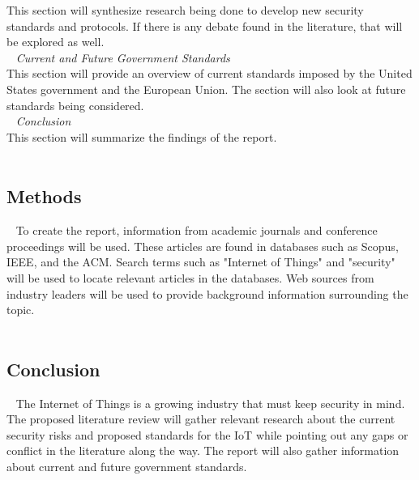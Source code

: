 \documentclass[letterpaper, 12pt]{texMemo}
\begin{document}
\begin{flushleft}
This section will synthesize research being done to develop new security standards and protocols. If there is any debate found in
the literature, that will be explored as well.\\ 
~\newline
\textit{Current and Future Government Standards}\\
This section will provide an overview of current standards imposed by the United States government and the European Union. The section will also look at 
future standards being considered.\\
~\newline
\textit{Conclusion}\\
This section will summarize the findings of the report.\\
~\newline

\subsection*{Methods}
~\newline
To create the report, information from academic journals and conference proceedings will be used. These articles are found in 
databases such as Scopus, IEEE, and the ACM. Search terms such as "Internet of Things" and "security" will be used to locate
relevant articles in the databases. Web sources from industry leaders will be used to provide background information surrounding
the topic.\\ 
~\newline

\subsection*{Conclusion}
~\newline
The Internet of Things is a growing industry that must keep security in mind. The proposed literature review will gather relevant 
research about the current security risks and proposed standards for the IoT while pointing out any gaps or conflict in the literature along the way. 
The report will also gather information about current and future government standards.


\end{flushleft}
\end{document}

